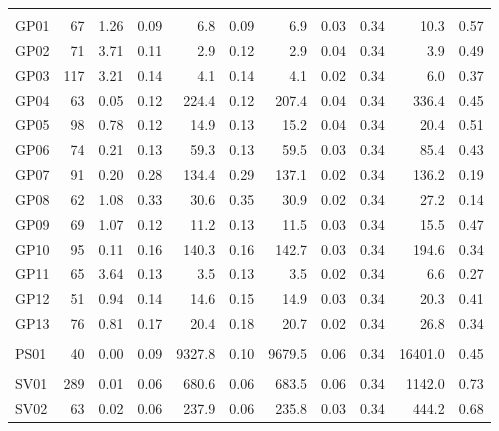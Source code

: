 \begin{longtable}[t]{lrrrrrrrrrr}
\addlinespace[0.3em]
\multicolumn{11}{l}{\textbf{Germplasms}}\\
\hspace{1em}GP01 & 67 & 1.26 & 0.09 & 6.8 & 0.09 & 6.9 & 0.03 & 0.34 & 10.3 & 0.57\\
\hspace{1em}GP02 & 71 & 3.71 & 0.11 & 2.9 & 0.12 & 2.9 & 0.04 & 0.34 & 3.9 & 0.49\\
\hspace{1em}GP03 & 117 & 3.21 & 0.14 & 4.1 & 0.14 & 4.1 & 0.02 & 0.34 & 6.0 & 0.37\\
\hspace{1em}GP04 & 63 & 0.05 & 0.12 & 224.4 & 0.12 & 207.4 & 0.04 & 0.34 & 336.4 & 0.45\\
\hspace{1em}GP05 & 98 & 0.78 & 0.12 & 14.9 & 0.13 & 15.2 & 0.04 & 0.34 & 20.4 & 0.51\\
\hspace{1em}GP06 & 74 & 0.21 & 0.13 & 59.3 & 0.13 & 59.5 & 0.03 & 0.34 & 85.4 & 0.43\\
\hspace{1em}GP07 & 91 & 0.20 & 0.28 & 134.4 & 0.29 & 137.1 & 0.02 & 0.34 & 136.2 & 0.19\\
\hspace{1em}GP08 & 62 & 1.08 & 0.33 & 30.6 & 0.35 & 30.9 & 0.02 & 0.34 & 27.2 & 0.14\\
\hspace{1em}GP09 & 69 & 1.07 & 0.12 & 11.2 & 0.13 & 11.5 & 0.03 & 0.34 & 15.5 & 0.47\\
\hspace{1em}GP10 & 95 & 0.11 & 0.16 & 140.3 & 0.16 & 142.7 & 0.03 & 0.34 & 194.6 & 0.34\\
\hspace{1em}GP11 & 65 & 3.64 & 0.13 & 3.5 & 0.13 & 3.5 & 0.02 & 0.34 & 6.6 & 0.27\\
\hspace{1em}GP12 & 51 & 0.94 & 0.14 & 14.6 & 0.15 & 14.9 & 0.03 & 0.34 & 20.3 & 0.41\\
\hspace{1em}GP13 & 76 & 0.81 & 0.17 & 20.4 & 0.18 & 20.7 & 0.02 & 0.34 & 26.8 & 0.34\\
\addlinespace[0.3em]
\multicolumn{11}{l}{\textbf{Pelleted Seeds}}\\
\hspace{1em}PS01 & 40 & 0.00 & 0.09 & 9327.8 & 0.10 & 9679.5 & 0.06 & 0.34 & 16401.0 & 0.45\\
\addlinespace[0.3em]
\multicolumn{11}{l}{\textbf{Seed Viroids}}\\
\hspace{1em}SV01 & 289 & 0.01 & 0.06 & 680.6 & 0.06 & 683.5 & 0.06 & 0.34 & 1142.0 & 0.73\\
\hspace{1em}SV02 & 63 & 0.02 & 0.06 & 237.9 & 0.06 & 235.8 & 0.03 & 0.34 & 444.2 & 0.68\\*
\end{longtable}
